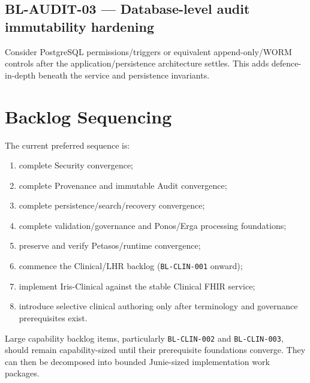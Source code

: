 \subsection{BL-AUDIT-03 — Database-level audit immutability hardening}
 Consider PostgreSQL permissions/triggers or equivalent append-only/WORM controls after the application/persistence architecture settles. This adds defence-in-depth beneath the service and persistence invariants.

\section{Backlog Sequencing}

The current preferred sequence is:

\begin{enumerate}
    \item complete Security convergence;
    \item complete Provenance and immutable Audit convergence;
    \item complete persistence/search/recovery convergence;
    \item complete validation/governance and Ponos/Erga processing foundations;
    \item preserve and verify Petasos/runtime convergence;
    \item commence the Clinical/LHR backlog (\texttt{BL-CLIN-001} onward);
    \item implement Iris-Clinical against the stable Clinical FHIR service;
    \item introduce selective clinical authoring only after terminology and governance prerequisites exist.
\end{enumerate}

Large capability backlog items, particularly \texttt{BL-CLIN-002} and \texttt{BL-CLIN-003}, should remain capability-sized until their prerequisite foundations converge. They can then be decomposed into bounded Junie-sized implementation work packages.
